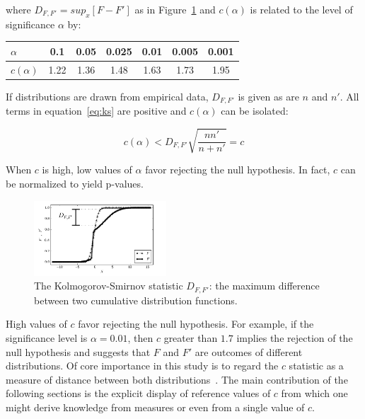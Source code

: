 \documentclass[12pt,fleqn]{article}
\begin{document}
\noindent where $D_{F,F'}=sup_x[F-F']$ as in Figure~\ref{fig:dnn}
and $c(\alpha)$ is related to the level of significance $\alpha$ by:

\begin{table}[h!]
\centering
\begin{tabular}{|l||c|c|c|c|c|c|}\hline
$\alpha$    & 0.1  & 0.05 & 0.025 & 0.01 & 0.005 & 0.001 \\\hline
$c(\alpha)$ & 1.22 & 1.36 & 1.48  & 1.63 & 1.73  & 1.95  \\\hline
\end{tabular}
\end{table}

If distributions are drawn from empirical data, $D_{F,F'}$ is given as are $n$ and $n'$.
All terms in equation~\ref{eq:ks} are positive and $c(\alpha)$ can be isolated:

\begin{equation}\label{eq:ks2}
	c(\alpha) < D_{F,F'}\sqrt{\frac{nn'}{n+n'}} = c
\end{equation}

When $c$ is high, low values of $\alpha$ favor rejecting the null hypothesis.
In fact, $c$ can be normalized to yield p-values.

\begin{figure}[!h]
	\centering
	\includegraphics[width=0.44\textwidth]{figs/Dnn}
	\caption{The Kolmogorov-Smirnov statistic $D_{F,F'}$: the maximum difference between
		two cumulative distribution functions.}
	\label{fig:dnn}
\end{figure}

High values of $c$ favor rejecting the null hypothesis.
For example, if the significance level is $\alpha=0.01$,
then $c$ greater than $1.7$
implies the rejection of the null hypothesis and
suggests that $F$ and $F'$
are outcomes of different distributions.
Of core importance in this study is to regard the $c$ statistic
as a measure of distance between both distributions~\cite{kolm}.
The main contribution of the following sections is the
explicit display of reference values of $c$
from which one might derive knowledge from
measures or even from a single value of $c$.
\end{document}
